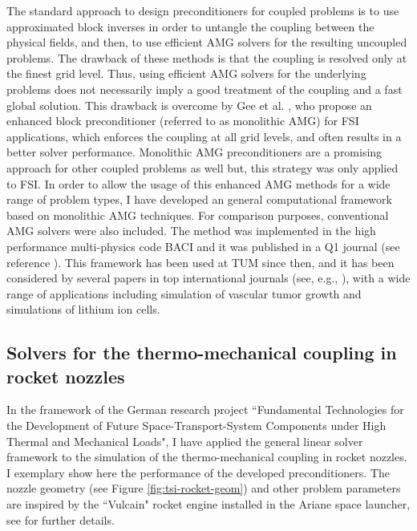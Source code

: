 \documentclass{article}
\newcommand{\bemph}[1]{#1}
\begin{document}
The standard approach to design preconditioners for coupled problems is to use approximated block inverses in order to untangle the coupling between the physical fields, and then, to use efficient AMG solvers for the resulting uncoupled problems. The drawback of these methods is that the coupling is resolved only at the finest grid level. Thus, using efficient AMG solvers for the underlying problems does not necessarily imply a good treatment of the coupling and a fast global solution. This drawback is overcome by Gee et al. \cite{gee_2011}, who propose an enhanced block preconditioner (referred to as monolithic AMG) for FSI applications, which enforces the coupling at all grid levels, and often results in a better solver performance. Monolithic AMG preconditioners are a promising approach for other coupled problems as well but, this strategy was only applied to FSI. In order to allow the usage of this enhanced AMG methods for a wide range of problem types, \bemph{I have developed an general computational framework based on monolithic AMG techniques}. For comparison purposes, conventional AMG solvers were also included. The method was implemented in the high performance multi-physics code BACI and \bemph{it was published in a Q1 journal} (see reference \cite{verdugo_2016}). This framework has been used at TUM since then, and \bemph{it has been considered by several papers in top international journals} (see, e.g., \cite{kremheller_2018}\cite{fang_2018}), with a wide range of applications including  simulation of vascular tumor growth and simulations of lithium ion cells.


\subsection{Solvers for the thermo-mechanical coupling in rocket nozzles}

In the framework of the \bemph{German research project} ``Fundamental Technologies for the Development of Future Space-Transport-System Components under High Thermal and Mechanical Loads", I have applied the general linear solver framework to the simulation of the thermo-mechanical coupling in rocket nozzles. I exemplary show here the performance of the developed preconditioners. The nozzle geometry  (see Figure \ref{fig:tsi-rocket-geom}) and other problem parameters are inspired by the ``Vulcain" rocket engine installed in the Ariane space launcher, see  \cite{verdugo_2016} for further details.
\end{document}
